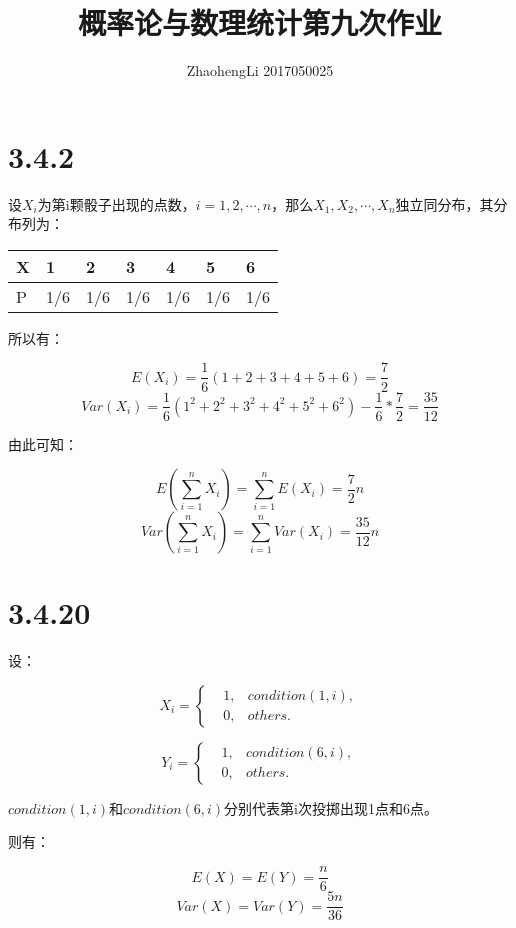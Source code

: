 \documentclass{article}
\title{概率论与数理统计第九次作业}
\author{ZhaohengLi 2017050025}
\begin{document}
\maketitle

\section{3.4.2}
设$X_i$为第i颗骰子出现的点数，$i=1,2,\cdots,n$，那么$X_1,X_2,\cdots,X_n$独立同分布，其分布列为：

\begin{table}[H]
\centering
\begin{tabular}{|l|l|l|l|l|l|l|}
\hline
X & 1 & 2 & 3 & 4 & 5 & 6 \\ \hline
P & 1/6  &  1/6 & 1/6  & 1/6  & 1/6  & 1/6  \\ \hline
\end{tabular}
\end{table}

所以有：

$$E(X_i)=\frac16(1+2+3+4+5+6)=\frac72$$
$$Var(X_i)=\frac16(1^2+2^2+3^2+4^2+5^2+6^2)-\frac16*\frac72=\frac{35}{12}$$

由此可知：

$$E(\sum^n_{i=1}X_i)=\sum^n_{i=1}E(X_i)=\frac72n$$
$$Var(\sum^n_{i=1}X_i)=\sum^n_{i=1}Var(X_i)=\frac{35}{12}n$$


\section{3.4.20}

设：


\begin{equation}
X_i=\left\{
\begin{aligned}
&1,& condition(1,i),\\
&0,& others.
\end{aligned}
\right.
\end{equation}


\begin{equation}
Y_i=\left\{
\begin{aligned}
&1,& condition(6,i),\\
&0,& others.
\end{aligned}
\right.
\end{equation}

$condition(1,i)$和$condition(6,i)$分别代表第i次投掷出现1点和6点。

则有：

$$E(X)=E(Y)=\frac n6$$
$$Var(X)=Var(Y)=\frac{5n}{36}$$
\end{document}
